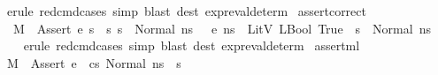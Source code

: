 \begin{isabellebody}
\isamarkupfalse%
\ {\isacharparenleft}{\kern0pt}erule\ red{\isacharunderscore}{\kern0pt}cmd{\isachardot}{\kern0pt}cases{\isacharsemicolon}{\kern0pt}\ simp{\isacharsemicolon}{\kern0pt}\ blast\ dest{\isacharcolon}{\kern0pt}\ expr{\isacharunderscore}{\kern0pt}eval{\isacharunderscore}{\kern0pt}determ{\isacharparenleft}{\kern0pt}{}{\isacharparenright}{\kern0pt}{\isacharparenright}{\kern0pt}%
\endisatagproof
{\isafoldproof}%
%
\isadelimproof
\isanewline
%
\endisadelimproof
\isanewline
\isanewline
{}\isamarkupfalse%
\ assert{\isacharunderscore}{\kern0pt}correct{\isacharunderscore}{\kern0pt}{}{\isacharcolon}{\kern0pt}\isanewline
\ \ {\isachardoublequoteopen}{\isasymlbrakk}M{\isacharcomma}{\kern0pt}{\isasymLambda}{\isacharcomma}{\kern0pt}{\isasymGamma}{\isacharcomma}{\kern0pt}{\isasymDelta}\ {\isasymturnstile}\ {\isasymlangle}Assert\ e{\isacharcomma}{\kern0pt}\ s{\isasymrangle}\ {\isasymrightarrow}\ s{\isacharprime}{\kern0pt}{\isacharsemicolon}{\kern0pt}\ s\ {\isacharequal}{\kern0pt}\ Normal\ n{\isacharunderscore}{\kern0pt}s{\isacharsemicolon}{\kern0pt}\ {\isasymLambda}{\isacharcomma}{\kern0pt}{\isasymGamma}{\isacharcomma}{\kern0pt}{\isasymDelta}\ {\isasymturnstile}\ {\isasymlangle}e{\isacharcomma}{\kern0pt}\ n{\isacharunderscore}{\kern0pt}s{\isasymrangle}\ {\isasymDown}\ LitV\ {\isacharparenleft}{\kern0pt}LBool\ True{\isacharparenright}{\kern0pt}{\isasymrbrakk}\ {\isasymLongrightarrow}\ s{\isacharprime}{\kern0pt}\ {\isacharequal}{\kern0pt}\ Normal\ n{\isacharunderscore}{\kern0pt}s{\isachardoublequoteclose}\isanewline
%
\isadelimproof
\ \ %
\endisadelimproof
%
\isatagproof
{}\isamarkupfalse%
\ {\isacharparenleft}{\kern0pt}erule\ red{\isacharunderscore}{\kern0pt}cmd{\isachardot}{\kern0pt}cases{\isacharsemicolon}{\kern0pt}\ simp{\isacharsemicolon}{\kern0pt}\ blast\ dest{\isacharcolon}{\kern0pt}\ expr{\isacharunderscore}{\kern0pt}eval{\isacharunderscore}{\kern0pt}determ{\isacharparenleft}{\kern0pt}{}{\isacharparenright}{\kern0pt}{\isacharparenright}{\kern0pt}%
\endisatagproof
{\isafoldproof}%
%
\isadelimproof
\isanewline
%
\endisadelimproof
\isanewline
{}\isamarkupfalse%
\ assert{\isacharunderscore}{\kern0pt}ml{\isacharcolon}{\kern0pt}\ \isanewline
{\isachardoublequoteopen}{\isasymlbrakk}\ M{\isacharcomma}{\kern0pt}{\isasymLambda}{\isacharcomma}{\kern0pt}{\isasymGamma}{\isacharcomma}{\kern0pt}{\isasymDelta}\ {\isasymturnstile}\ {\isasymlangle}{\isacharparenleft}{\kern0pt}Assert\ e{\isacharparenright}{\kern0pt}\ {\isacharhash}{\kern0pt}\ cs{\isacharcomma}{\kern0pt}\ Normal\ ns{\isasymrangle}\ {\isacharbrackleft}{\kern0pt}{\isasymrightarrow}{\isacharbrackright}{\kern0pt}\ s{\isacharprime}{\kern0pt}{\isacharsemicolon}{\kern0pt}\isanewline

\end{isabellebody}
